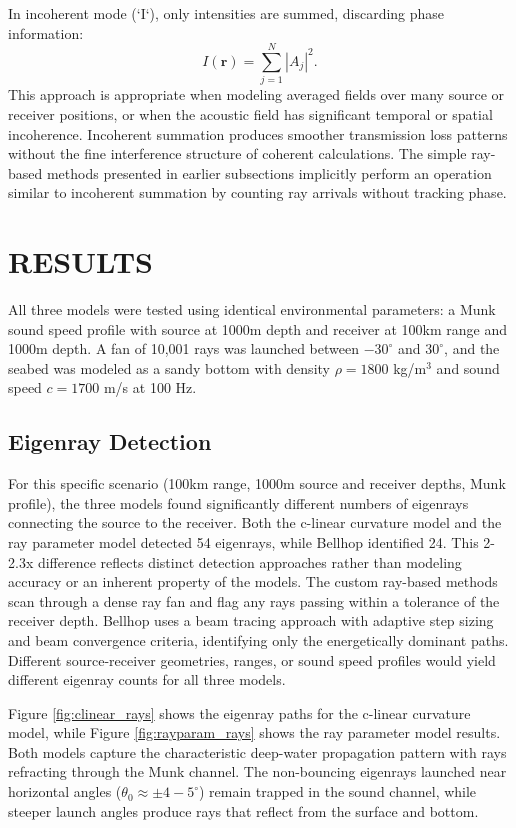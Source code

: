 \documentclass[fleqn]{jaes}
\begin{document}
In incoherent mode (`I`), only intensities are summed, discarding phase information:
\begin{equation}
I(\mathbf{r}) = \sum_{j=1}^{N} |A_j|^2.
\end{equation}
This approach is appropriate when modeling averaged fields over many source or receiver positions, or when the acoustic field has significant temporal or spatial incoherence. Incoherent summation produces smoother transmission loss patterns without the fine interference structure of coherent calculations. The simple ray-based methods presented in earlier subsections implicitly perform an operation similar to incoherent summation by counting ray arrivals without tracking phase.

\section{RESULTS}

All three models were tested using identical environmental parameters: a Munk sound speed profile with source at 1000m depth and receiver at 100km range and 1000m depth. A fan of 10,001 rays was launched between $-30^\circ$ and $30^\circ$, and the seabed was modeled as a sandy bottom with density $\rho = 1800$ kg/m$^3$ and sound speed $c = 1700$ m/s at 100 Hz.

\subsection{Eigenray Detection}

For this specific scenario (100km range, 1000m source and receiver depths, Munk profile), the three models found significantly different numbers of eigenrays connecting the source to the receiver. Both the c-linear curvature model and the ray parameter model detected 54 eigenrays, while Bellhop identified 24. This 2-2.3x difference reflects distinct detection approaches rather than modeling accuracy or an inherent property of the models. The custom ray-based methods scan through a dense ray fan and flag any rays passing within a tolerance of the receiver depth. Bellhop uses a beam tracing approach with adaptive step sizing and beam convergence criteria, identifying only the energetically dominant paths. Different source-receiver geometries, ranges, or sound speed profiles would yield different eigenray counts for all three models.

Figure \ref{fig:clinear_rays} shows the eigenray paths for the c-linear curvature model, while Figure \ref{fig:rayparam_rays} shows the ray parameter model results. Both models capture the characteristic deep-water propagation pattern with rays refracting through the Munk channel. The non-bouncing eigenrays launched near horizontal angles ($\theta_0 \approx \pm 4-5^\circ$) remain trapped in the sound channel, while steeper launch angles produce rays that reflect from the surface and bottom.
\end{document}
